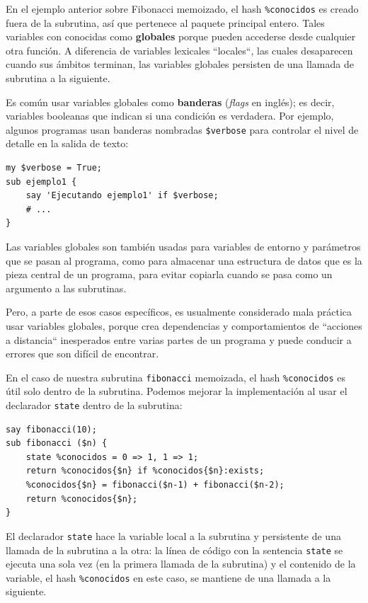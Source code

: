 En el ejemplo anterior sobre Fibonacci memoizado, el hash \verb|%conocidos|
es creado fuera de la subrutina, así que pertenece al 
paquete principal entero. Tales variables con conocidas
como {\bf globales} porque pueden accederse desde cualquier
otra función. A diferencia de variables lexicales ``locales``, 
las cuales desaparecen cuando sus ámbitos terminan, las 
variables globales persisten de una llamada de subrutina 
a la siguiente.

Es común usar variables globales como {\bf banderas} (\emph{flags} en inglés);
es decir, variables booleanas que indican si una condición es
verdadera. Por ejemplo, algunos programas usan banderas nombradas
\verb|$verbose| para controlar el nivel de detalle en la salida de texto:

\begin{lstlisting}
my $verbose = True;
sub ejemplo1 {
    say 'Ejecutando ejemplo1' if $verbose;
    # ...
}
\end{lstlisting}
%

Las variables globales son también usadas para variables
de entorno y parámetros que se pasan al programa, como 
para almacenar una estructura de datos que es la pieza central
de un programa, para evitar copiarla cuando se pasa como un 
argumento a las subrutinas.

Pero, a parte de esos casos específicos, es usualmente
considerado mala práctica usar variables globales, porque
crea dependencias y comportamientos de ``acciones a distancia``
inesperados entre varias partes de un programa y puede conducir
a errores que son difícil de encontrar.

En el caso de nuestra subrutina \verb|fibonacci| memoizada,
el hash \verb|%conocidos| es útil solo dentro de la subrutina.
Podemos mejorar la implementación al usar el declarador \verb|state|
dentro de la subrutina:

\begin{lstlisting}
say fibonacci(10);
sub fibonacci ($n) {
    state %conocidos = 0 => 1, 1 => 1;
    return %conocidos{$n} if %conocidos{$n}:exists;
    %conocidos{$n} = fibonacci($n-1) + fibonacci($n-2);
    return %conocidos{$n};
}
\end{lstlisting}
%
El declarador \verb|state| hace la variable local a la subrutina
y persistente de una llamada de la subrutina a la otra: la línea de
código con la sentencia \verb|state| se ejecuta una sola vez 
(en la primera llamada de la subrutina) y el contenido de la 
variable, el hash \verb|%conocidos| en este caso, se mantiene
de una llamada a la siguiente.


